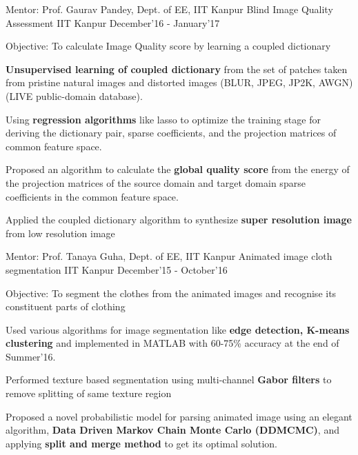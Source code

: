 \begin{cventries}
  \cventry
    {Mentor: Prof. Gaurav Pandey, Dept. of EE, IIT Kanpur}
    {Blind Image Quality Assessment}
    {IIT Kanpur}
    {December'16 - January'17}
    {
      \begin{cvitems}
        \item {Objective: To calculate Image Quality score by learning a coupled dictionary}
        \item {\textbf{Unsupervised learning of coupled dictionary} from the set of patches taken from pristine natural images and distorted images (BLUR, JPEG, JP2K, AWGN) (LIVE public-domain database).}
        \item {Using \textbf{regression algorithms} like lasso to optimize the training stage for deriving the dictionary pair, sparse coefficients, and the projection matrices of common feature space.}
        \item {Proposed an algorithm to calculate the \textbf{global quality score} from the energy of the projection matrices of the source domain and target domain sparse coefficients in the common feature space.}
        \item {Applied the coupled dictionary algorithm to synthesize \textbf{super resolution image} from low resolution image }
      \end{cvitems}
    }
  \cventry
    {Mentor: Prof. Tanaya Guha, Dept. of EE, IIT Kanpur}
    {Animated image cloth segmentation}
    {IIT Kanpur}
    {December’15 - October’16}
    {
      \begin{cvitems}
        \item {Objective: To segment the clothes from the animated images and recognise its constituent parts of clothing}
        \item {Used various algorithms for image segmentation like \textbf{edge detection, K-means clustering} and implemented in MATLAB with 60-75\% accuracy at the end of Summer’16.}
        \item {Performed texture based segmentation using multi-channel \textbf{Gabor filters} to remove splitting of same texture region}
        \item {Proposed a novel probabilistic model for parsing animated image using an elegant algorithm, \textbf{Data Driven Markov Chain Monte Carlo (DDMCMC)}, and applying \textbf{split and merge method} to get its optimal solution.}
      \end{cvitems}
    }

\end{cventries}
